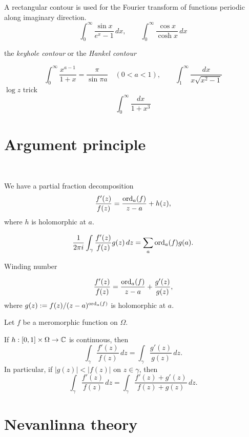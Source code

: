 \documentclass{../../large}
\begin{document}
\begin{prb}
A rectangular contour is used for the Fourier transform of functions periodic along imaginary direction.
\[\int_0^\infty\frac{\sin x}{e^x-1}\,dx,\qquad\int_0^\infty\frac{\cos x}{\cosh x}\,dx\]
\end{prb}

\begin{prb}
the \emph{keyhole contour} or the \emph{Hankel contour}

\[\int_0^\infty\frac{x^{a-1}}{1+x}=\frac\pi{\sin\pi a}\quad(0<a<1),\qquad\int_1^\infty\frac{dx}{x\sqrt{x^2-1}}\]
$\log z$ trick
\[\int_0^\infty\frac{dx}{1+x^3}\]
\end{prb}






\section{Argument principle}

\begin{prb}\,
\begin{parts}
\item We have a partial fraction decomposition
\[\frac{f'(z)}{f(z)}=\frac{\operatorname{ord}_a(f)}{z-a}+h(z),\]
where $h$ is holomorphic at $a$.
\item
\[\frac1{2\pi i}\int_\gamma\frac{f'(z)}{f(z)}g(z)\,dz=\sum_a\operatorname{ord}_a(f)g(a).\]
\item Winding number
\end{parts}
\end{prb}
\begin{pf}
\[\frac{f'(z)}{f(z)}=\frac{\operatorname{ord}_a(f)}{z-a}+\frac{g'(z)}{g(z)},\]
where $g(z):=f(z)/(z-a)^{\operatorname{ord}_a(f)}$ is holomorphic at $a$.
\end{pf}


\begin{prb}
Let $f$ be a meromorphic function on $\Omega$.
\begin{parts}
\item
If $h:[0,1]\times\Omega\to\mathbb{C}$ is continuous, then 
\[\int_\gamma\frac{f'(z)}{f(z)}\,dz=\int_\gamma\frac{g'(z)}{g(z)}\,dz.\]
In particular, if $|g(z)|<|f(z)|$ on $z\in\gamma$, then
\[\int_\gamma\frac{f'(z)}{f(z)}\,dz=\int_\gamma\frac{f'(z)+g'(z)}{f(z)+g(z)}\,dz.\]
\end{parts}
\end{prb}

\section{Nevanlinna theory}
\end{document}
